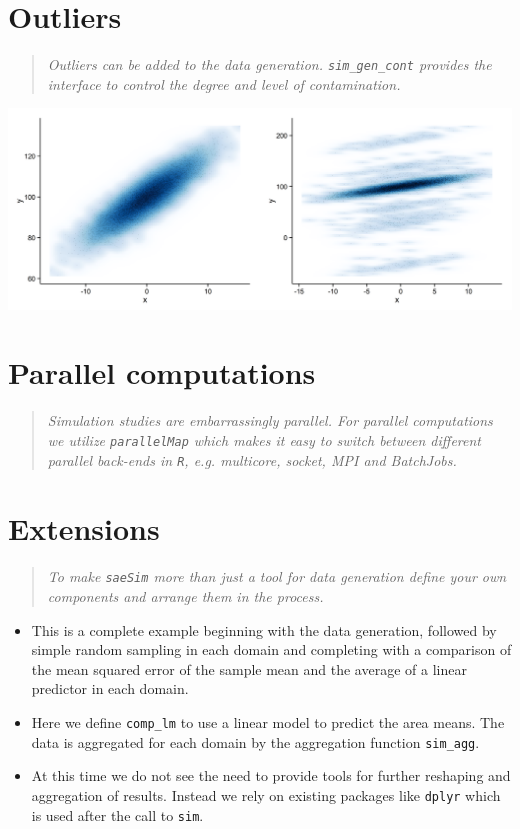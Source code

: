 \documentclass[a0,portrait]{a0poster}\usepackage[]{graphicx}\usepackage[]{color}
\newcommand{\mysec}[1]{\color{Black}\section*{#1}\color{DarkSlateGray}}
\newcommand{\code}[1]{\texttt{#1}}
\newcommand{\inputR}[1]{}
\begin{document}
\begin{multicols}{2}
\mysec{Outliers}

\begin{verse}
\textit{Outliers can be added to the data generation. \texttt{sim\_gen\_cont} provides the interface to control the degree and level of contamination.}
\end{verse}

\inputR{Rmd/outliers}
\includegraphics[width=\linewidth]{figs/outliers/outliers-1}

\columnbreak

\mysec{Parallel computations}

\begin{verse}
\textit{Simulation studies are embarrassingly parallel. For parallel computations we utilize \code{parallelMap} which makes it easy to switch between different parallel back-ends in \code{R}, e.g. multicore, socket, MPI and BatchJobs.}
\end{verse}

\inputR{Rmd/parallelComputations}


\mysec{Extensions}

\begin{verse}
\textit{To make \texttt{saeSim} more than just a tool for data generation define your own components and arrange them in the process.}
\end{verse}

\begin{itemize}
  \item This is a complete example beginning with the data generation, followed by simple random sampling in each domain and completing with a comparison of the mean squared error of the sample mean and the average of a linear predictor in each domain.
  \item Here we define \texttt{comp\_lm} to use a linear model to predict the area means. The data is aggregated for each domain by the aggregation function \texttt{sim\_agg}.
  \item At this time we do not see the need to provide tools for further reshaping and aggregation of results. Instead we rely on existing packages like \texttt{dplyr} which is used after the call to \texttt{sim}.
\end{itemize}


\end{multicols}
\end{document}
